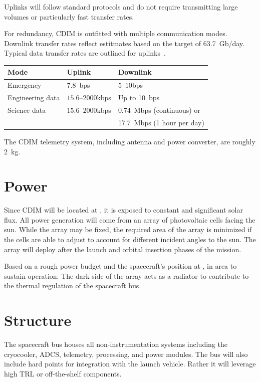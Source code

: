 \documentclass{ws-jai}
\begin{document}
Uplinks will follow standard protocols and do not require transmitting large volumes or particularly fast transfer rates.

\begin{wstable}[htp]
  \caption{For redundancy, CDIM is outfitted with multiple communication modes. Downlink transfer rates reflect estitmates based on the target of \SI{63.7}{Gb/day}. Typical data transfer rates are outlined for uplinks~\cite{smad2015}.
\label{tab:telemetry}}
  \begin{tabular}{@{}lll@{}} \toprule
    Mode & Uplink & Downlink \\ \midrule
    Emergency & \SI{7.8}{bps} & $5$--$10$\si{bps} \\
    Engineering data & $15.6$--$2000$\si{kbps} & Up to \SI{10}{bps} \\
    Science data & $15.6$--$2000$\si{kbps} & \SI{0.74}{Mbps} (continuous) or \\
    & & \SI{17.7}{Mbps} (1 hour per day)\\\bottomrule
  \end{tabular}
\end{wstable}
The CDIM telemetry system, including antenna and power converter, are roughly \SI{2}{kg}.

\section{Power}
\label{sec:power}
Since CDIM will be located at \Ltwo, it is exposed to constant and significant solar flux.
All power generation will come from an array of photovoltaic cells facing the sun.
While the array may be fixed, the required area of the array is minimized if the cells are able to adjust to account for different incident angles to the sun.
The array will deploy after the launch and orbital insertion phases of the mission.

Based on a rough power budget and the spacecraft's position at \Ltwo,  in area to sustain operation.
The dark side of the array acts as a radiator to contribute to the thermal regulation of the spacecraft bus.


\section{Structure}
\label{sec:structure}
The spacecraft bus houses all non-instrumentation systems including the cryocooler, ADCS, telemetry, processing, and power modules.
The bus will also include hard points for integration with the launch vehicle.
 Rather it will leverage high TRL or off-the-shelf components.
\end{document}
